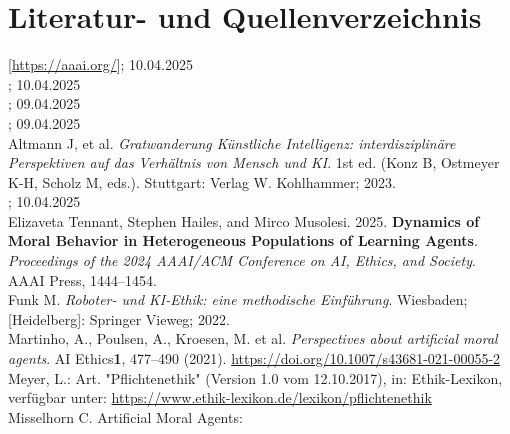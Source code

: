 \section{Literatur- und Quellenverzeichnis}\label{sec::literaturverzeichnis}

[\href{https://aaai.org/}{https://aaai.org/}]; 10.04.2025 \\
; 10.04.2025 \\
; 09.04.2025 \\
; 09.04.2025 \\
\newline
Altmann J, et al.
\textit{Gratwanderung Künstliche Intelligenz: interdisziplinäre Perspektiven auf das Verhältnis von Mensch und KI}.
1st ed.
(Konz B, Ostmeyer K-H, Scholz M, eds.). Stuttgart: Verlag W. Kohlhammer; 2023. \\
; 10.04.2025 \\
\newline
Elizaveta Tennant, Stephen Hailes, and Mirco Musolesi. 2025.
\textbf{Dynamics of Moral Behavior in Heterogeneous Populations of Learning Agents}.
\textit{Proceedings of the 2024 AAAI/ACM Conference on AI, Ethics, and Society}.
AAAI Press, 1444–1454. \\
\newline
Funk M.
\textit{Roboter- und KI-Ethik: eine methodische Einführung}.
Wiesbaden; [Heidelberg]: Springer Vieweg; 2022. \\
\newline
Martinho, A., Poulsen, A., Kroesen, M. et al. \textit{Perspectives about artificial moral agents}.
AI Ethics\textbf{1}, 477–490 (2021).
\href{https://doi.org/10.1007/s43681-021-00055-2}{https://doi.org/10.1007/s43681-021-00055-2} \\
\newline
Meyer, L.: Art.
"Pflichtenethik" (Version 1.0 vom 12.10.2017), in: Ethik-Lexikon, verfügbar unter:
\href{https://www.ethik-lexikon.de/lexikon/pflichtenethik}{https://www.ethik-lexikon.de/lexikon/pflichtenethik} \\
\newline
Misselhorn C. Artificial Moral Agents:
